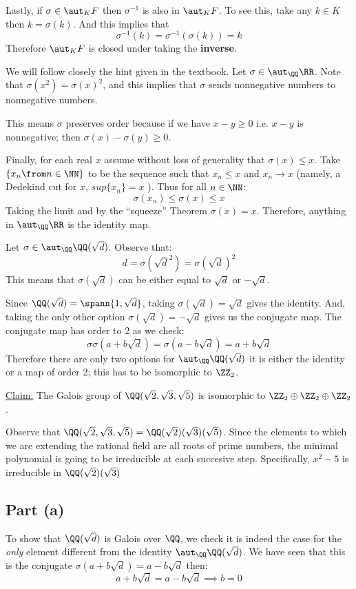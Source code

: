 Lastly, if $\sigma\in \aut_KF$ then $\sigma^{-1}$ is also in $\aut_K F$. To see this, take any $k\in K$ then $k= \sigma(k)$.  And this implies that 
$$\sigma^{-1}(k) = \sigma^{-1}(\sigma(k)) = k$$
Therefore $\aut_K F$ is closed under taking the \textbf{inverse}.
    

We will follow closely the hint given in the textbook. Let $\sigma\in \aut_\QQ \RR$. Note that $\sigma(x^2) = \sigma(x)^2$, and this implies that $\sigma$ sends nonnegative numbers to nonnegative numbers. 

This means $\sigma$ preserves order because if we have $x-y\geq 0$ i.e. $x-y$ is nonnegative; then $\sigma(x) - \sigma(y)\geq 0$.

Finally, for each real $x$ assume without loss of generality that $\sigma(x)\leq x$. Take $\{x_n \from n\in \NN\}$ to be the sequence such that $x_n\leq x$ and $x_n\to x$ (namely, a Dedekind cut for $x$, $sup\{x_n\} =x$ ). Thus for all $n\in \NN$:
$$\sigma(x_n)\leq \sigma(x)\leq x$$
Taking the limit and by the ``squeeze'' Theorem $\sigma(x) = x$. Therefore, anything in $\aut_\QQ \RR$ is the identity map.

Let $\sigma \in \aut_\QQ\QQ(\sqrt d)$. Observe that:
$$d= \sigma(\sqrt d^2)= \sigma(\sqrt d)^2 $$
This means that $\sigma(\sqrt d)$ can be either equal to $\sqrt d$ or $-\sqrt d$. 

Since $\QQ(\sqrt d)= \spann\{ 1,\sqrt{d}\}$, taking $\sigma(\sqrt{d}) =\sqrt{d}$ gives the identity. And, taking the only other option $\sigma(\sqrt{d}) =-\sqrt{d}$ gives us the conjugate map. The conjugate map has order to 2 as we check:
$$\sigma\sigma(a+ b\sqrt{d}) = \sigma(a-b\sqrt{d}) = a+b\sqrt{d}$$
Therefore there are only two options for $\aut_\QQ \QQ(\sqrt{d})$ it is either the identity or a map of order 2; this has to be isomorphic to $\ZZ_2$.


\underline{Claim:} The Galois group of $\QQ(\sqrt 2, \sqrt 3, \sqrt 5)$ is isomorphic to $\ZZ_2\oplus \ZZ_2 \oplus \ZZ_2$.

Observe that   $\QQ(\sqrt 2, \sqrt 3, \sqrt 5)=\QQ(\sqrt 2)( \sqrt 3) (\sqrt 5)$. Since the elements to which we are extending the rational field are all roots of prime numbers, the minimal polynomial is going to be irreducible at each succesive step. Specifically, $x^2-5$ is irreducible in $\QQ(\sqrt 2)( \sqrt 3)$
\subsection*{Part (a)}
To show that $\QQ(\sqrt{d})$ is Galois over $\QQ$, we check it is indeed the case for the \emph{only} element different from the identity $\aut_\QQ \QQ(\sqrt{d})$. We have seen that this is the conjugate $\sigma(a+b\sqrt{d})=a-b\sqrt{d}$ then:
$$a+b\sqrt{d}=a-b\sqrt{d} \implies b=0$$

